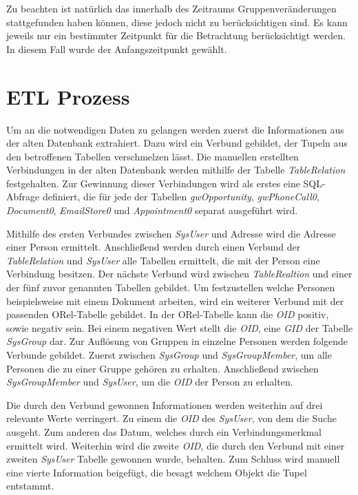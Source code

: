 Zu beachten ist natürlich das innerhalb des Zeitraums Gruppenveränderungen stattgefunden haben können, diese jedoch nicht zu berücksichtigen sind. Es kann jeweils nur ein bestimmter Zeitpunkt für die Betrachtung berücksichtigt werden. In diesem Fall wurde der Anfangszeitpunkt gewählt.

\section{ETL Prozess}

Um an die notwendigen Daten zu gelangen werden zuerst die Informationen aus der alten Datenbank extrahiert. Dazu wird ein Verbund gebildet, der Tupeln aus den betroffenen Tabellen verschmelzen lässt. Die manuellen erstellten Verbindungen in der alten Datenbank werden mithilfe der Tabelle \textit{TableRelation} festgehalten. Zur Gewinnung dieser Verbindungen wird als erstes eine SQL-Abfrage definiert, die für jede der Tabellen \textit{gwOpportunity}, \textit{gwPhoneCall0}, \textit{Document0}, \textit{EmailStore0} und \textit{Appointment0} separat ausgeführt wird. 

Mithilfe des ersten Verbundes zwischen \textit{SysUser} und Adresse wird die Adresse einer Person ermittelt. Anschließend werden durch einen Verbund der \textit{TableRelation} und \textit{SysUser} alle Tabellen ermittelt, die mit der Person eine Verbindung besitzen. Der nächste Verbund wird zwischen \textit{TableRealtion} und einer der fünf zuvor genannten Tabellen gebildet. Um festzustellen welche Personen beispielsweise mit einem Dokument arbeiten, wird ein weiterer Verbund mit der passenden ORel-Tabelle gebildet. In der ORel-Tabelle kann die \textit{OID} positiv, sowie negativ sein. Bei einem negativen Wert stellt die \textit{OID}, eine \textit{GID} der Tabelle \textit{SysGroup} dar. Zur Auflösung von Gruppen in einzelne Personen werden folgende Verbunde gebildet. Zuerst zwischen \textit{SysGroup} und \textit{SysGroupMember}, um alle Personen die zu einer Gruppe gehören zu erhalten. Anschließend zwischen \textit{SysGroupMember} und \textit{SysUser}, um die \textit{OID} der Person zu erhalten. 


Die durch den Verbund gewonnen Informationen werden weiterhin auf drei relevante Werte verringert. Zu einem die \textit{OID} des \textit{SysUser}, von dem die Suche ausgeht. Zum anderen das Datum, welches durch ein Verbindungsmerkmal ermittelt wird. Weiterhin wird die zweite \textit{OID}, die durch den Verbund mit einer zweiten \textit{SysUser} Tabelle gewonnen wurde, behalten. Zum Schluss wird manuell eine vierte Information beigefügt, die besagt welchem Objekt die Tupel entstammt. 

